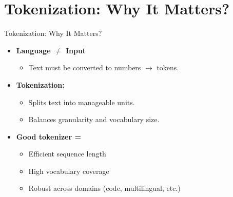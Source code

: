 \section{Tokenization: Why It Matters?}
\begin{frame}{Tokenization: Why It Matters?}
    \begin{itemize}
        \item \textbf{Language $\neq$ Input}
        \begin{itemize}
            \item Text must be converted to numbers $\rightarrow$ tokens.
        \end{itemize}
        \item \textbf{Tokenization:}
        \begin{itemize}
            \item Splits text into manageable units.
            \item Balances granularity and vocabulary size.
        \end{itemize}
        \item \textbf{Good tokenizer =}
        \begin{itemize}
            \item Efficient sequence length
            \item High vocabulary coverage
            \item Robust across domains (code, multilingual, etc.)
        \end{itemize}
    \end{itemize}
\end{frame}